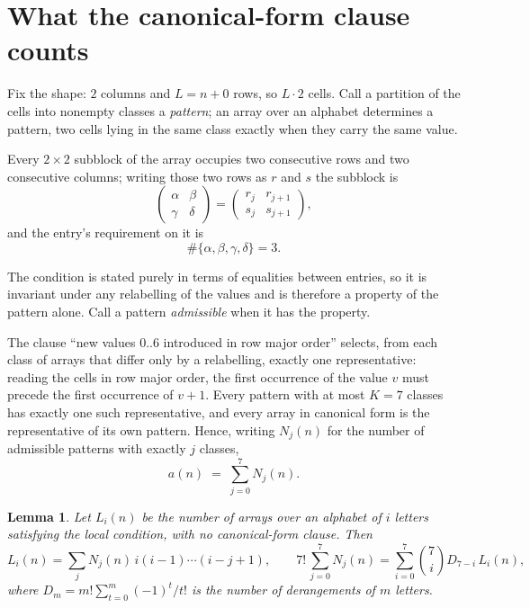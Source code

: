 \documentclass[11pt,a4paper]{article}
\theoremstyle{plain}
\newtheorem{lemma}[theorem]{Lemma}
\theoremstyle{definition}
\begin{document}
\section{What the canonical-form clause counts}

Fix the shape: $2$ columns and $L=n+0$ rows, so $L\cdot2$ cells. Call a
partition of the cells into nonempty classes a \emph{pattern}; an array over an alphabet
determines a pattern, two cells lying in the same class exactly when they carry the same
value.

Every $2\times2$ subblock of the array occupies two consecutive
rows and two consecutive columns; writing those two rows as $r$ and $s$ the
subblock is
\[
\begin{pmatrix}\alpha&\beta\\\gamma&\delta\end{pmatrix}=\begin{pmatrix}r_j&r_{j+1}\\s_j&s_{j+1}\end{pmatrix},
\]
and the entry's requirement on it is
\begin{equation}\label{eq:loc}
\#\{\alpha,\beta,\gamma,\delta\}=3.
\end{equation}

The condition is stated purely in terms of equalities between entries, so it is invariant
under any relabelling of the values and is therefore a property of the pattern alone. Call a
pattern \emph{admissible} when it has the property.

The clause ``new values $0..6$ introduced in row major order'' selects, from each class
of arrays that differ only by a relabelling, exactly one representative: reading the cells in
row major order, the first occurrence of the value $v$ must precede the first occurrence of
$v+1$. Every pattern with at most $K=7$ classes has exactly one such representative, and
every array in canonical form is the representative of its own pattern. Hence, writing
$N_j(n)$ for the number of admissible patterns with exactly $j$ classes,
\begin{equation}\label{eq:apat}
a(n)\;=\;\sum_{j=0}^{7}N_j(n).
\end{equation}

\begin{lemma}\label{lem:inv}
Let $L_i(n)$ be the number of arrays over an alphabet of $i$ letters satisfying the local
condition, with no canonical-form clause. Then
\[
L_i(n)=\sum_j N_j(n)\,i(i-1)\cdots(i-j+1),
\qquad
7!\,\sum_{j=0}^{7}N_j(n)=\sum_{i=0}^{7}\binom{7}{i}D_{7-i}\,L_i(n),
\]
where $D_m=m!\sum_{t=0}^{m}(-1)^t/t!$ is the number of derangements of $m$ letters.
\end{lemma}
\end{document}
